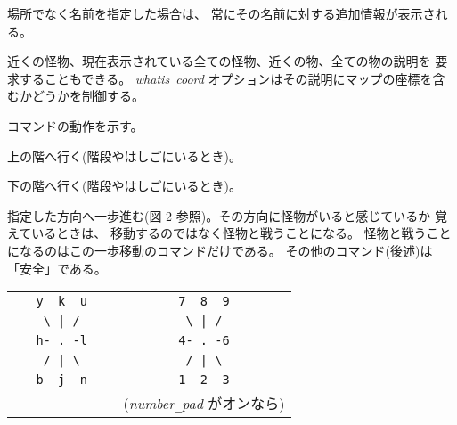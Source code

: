 場所でなく名前を指定した場合は、
常にその名前に対する追加情報が表示される。

近くの怪物、現在表示されている全ての怪物、近くの物、全ての物の説明を
要求することもできる。
{\it whatis\verb+_+coord\/}
オプションはその説明にマップの座標を含むかどうかを制御する。
\item[\tb{\&}]
コマンドの動作を示す。
\item[\tb{<}]
上の階へ行く(階段やはしごにいるとき)。
\item[\tb{>}]
下の階へ行く(階段やはしごにいるとき)。
\item[\tb{[yuhjklbn]}]
指定した方向へ一歩進む(図 2 参照)。その方向に怪物がいると感じているか
覚えているときは、
移動するのではなく怪物と戦うことになる。
怪物と戦うことになるのはこの一歩移動のコマンドだけである。
その他のコマンド(後述)は「安全」である。
\begin{center}
\begin{tabular}{cc}
\verb+   y  k  u   + & \verb+   7  8  9   +\\
\verb+    \ | /    + & \verb+    \ | /    +\\
\verb+   h- . -l   + & \verb+   4- . -6   +\\
\verb+    / | \    + & \verb+    / | \    +\\
\verb+   b  j  n   + & \verb+   1  2  3   +\\
                     & ({\it number\verb+_+pad\/} がオンなら)
\end{tabular}
\end{center}
